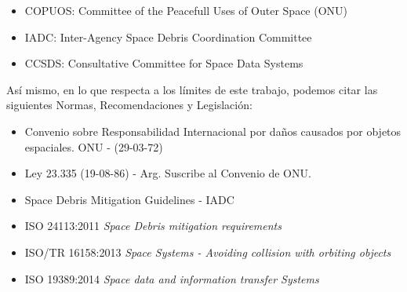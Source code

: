 {\begin{itemize}
\item {\small{COPUOS: Committee of the Peacefull Uses of Outer Space (ONU)}}
\item {\small{IADC: Inter-Agency Space Debris Coordination Committee}}
\item {\small{CCSDS: Consultative Committee for Space Data Systems}}
\end{itemize}

As\'i mismo, en lo que respecta a los l\'imites de este trabajo, podemos citar las siguientes Normas, Recomendaciones y Legislaci\'on:\\

\begin{itemize}
\item {\small{Convenio sobre Responsabilidad Internacional por da\~nos causados por objetos espaciales. ONU - (29-03-72)}}
\item {\small{Ley 23.335 (19-08-86) - Arg. Suscribe al Convenio de ONU.}}
\item {\small{Space Debris Mitigation Guidelines - IADC}}
\item {\small{ISO 24113:2011 {\it{Space Debris mitigation requirements}}}}
\item {\small{ISO/TR 16158:2013 {\it{Space Systems - Avoiding collision with orbiting objects}}}}
\item {\small{ISO 19389:2014 {\it{Space data and information transfer Systems}}}}

\end{itemize}

}
